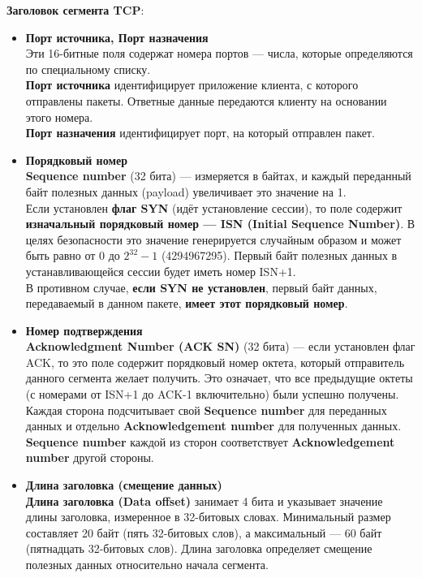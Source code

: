 \textbf{Заголовок сегмента TCP}:
\begin{itemize}
    \item \textbf{Порт источника, Порт назначения}\\
Эти 16-битные поля содержат номера портов — числа, которые определяются по специальному списку.\\


\textbf{Порт источника} идентифицирует приложение клиента, с которого отправлены пакеты. Ответные данные передаются клиенту на основании этого номера.\\


\textbf{Порт назначения} идентифицирует порт, на который отправлен пакет.

    \item \textbf{Порядковый номер}\\
\textbf{Sequence number} (32 бита) — измеряется в байтах, и каждый переданный байт полезных данных (payload) увеличивает это значение на 1.\\

Если установлен \textbf{флаг SYN} (идёт установление сессии), то поле содержит \textbf{изначальный порядковый номер — ISN (Initial Sequence Number)}. В целях безопасности это значение генерируется случайным образом и может быть равно от 0 до $2^{32}-1$ (4294967295). Первый байт полезных данных в устанавливающейся сессии будет иметь номер ISN+1.\\


В противном случае, \textbf{если SYN не установлен}, первый байт данных, передаваемый в данном пакете, \textbf{имеет этот порядковый номер}.\\
\item \textbf{Номер подтверждения}\\
\textbf{Acknowledgment Number (ACK SN)} (32 бита) — если установлен флаг ACK, то это поле содержит порядковый номер октета, который отправитель данного сегмента желает получить. Это означает, что все предыдущие октеты (с номерами от ISN+1 до ACK-1 включительно) были успешно получены.\\


Каждая сторона подсчитывает свой \textbf{Sequence number} для переданных данных и отдельно \textbf{Acknowledgement number} для полученных данных. \textbf{Sequence number} каждой из сторон соответствует \textbf{Acknowledgement number} другой стороны.

\item \textbf{Длина заголовка (смещение данных)}\\
\textbf{Длина заголовка (Data offset)} занимает 4 бита и указывает значение длины заголовка, измеренное в 32-битовых словах. Минимальный размер составляет 20 байт (пять 32-битовых слов), а максимальный — 60 байт (пятнадцать 32-битовых слов). Длина заголовка определяет смещение полезных данных относительно начала сегмента. 


\end{itemize}

